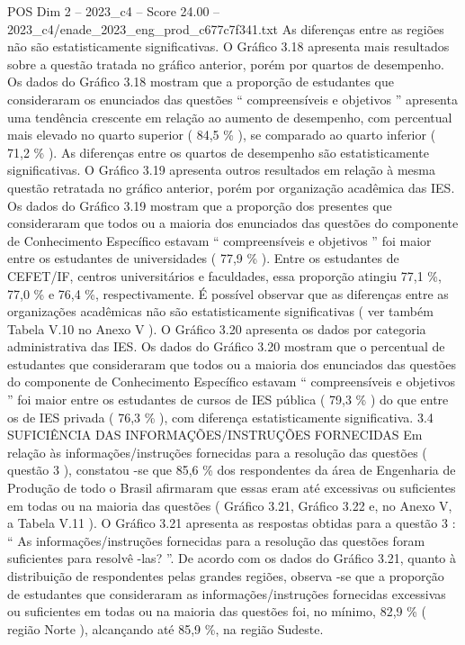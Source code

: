 \begin{textsample}{POS Dim 2 – 2023\_c4 – Score 24.00 – 2023\_c4/enade\_2023\_eng\_prod\_c677c7f341.txt}
As diferenças entre as regiões não são estatisticamente significativas.
O Gráfico 3.18 apresenta mais resultados sobre a questão tratada no gráfico anterior, porém por quartos de desempenho.
Os dados do Gráfico 3.18 mostram que a proporção de estudantes que consideraram os enunciados das questões “ compreensíveis e objetivos ” apresenta uma tendência crescente em relação ao aumento de desempenho, com percentual mais elevado no quarto superior ( 84,5 \% ), se comparado ao quarto inferior ( 71,2 \% ).
As diferenças entre os quartos de desempenho são estatisticamente significativas.
O Gráfico 3.19 apresenta outros resultados em relação à mesma questão retratada no gráfico anterior, porém por organização acadêmica das IES.
Os dados do Gráfico 3.19 mostram que a proporção dos presentes que consideraram que todos ou a maioria dos enunciados das questões do componente de Conhecimento Específico estavam “ compreensíveis e objetivos ” foi maior entre os estudantes de universidades ( 77,9 \% ).
Entre os estudantes de CEFET/IF, centros universitários e faculdades, essa proporção atingiu 77,1 \%, 77,0 \% e 76,4 \%, respectivamente.
É possível observar que as diferenças entre as organizações acadêmicas não são estatisticamente significativas ( ver também Tabela V.10 no Anexo V ).
O Gráfico 3.20 apresenta os dados por categoria administrativa das IES.
Os dados do Gráfico 3.20 mostram que o percentual de estudantes que consideraram que todos ou a maioria dos enunciados das questões do componente de Conhecimento Específico estavam “ compreensíveis e objetivos ” foi maior entre os estudantes de cursos de IES pública ( 79,3 \% ) do que entre os de IES privada ( 76,3 \% ), com diferença estatisticamente significativa. 3.4 SUFICIÊNCIA DAS INFORMAÇÕES/INSTRUÇÕES FORNECIDAS Em relação às informações/instruções fornecidas para a resolução das questões ( questão 3 ), constatou -se que 85,6 \% dos respondentes da área de Engenharia de Produção de todo o Brasil afirmaram que essas eram até excessivas ou suficientes em todas ou na maioria das questões ( Gráfico 3.21, Gráfico 3.22 e, no Anexo V, a Tabela V.11 ).
O Gráfico 3.21 apresenta as respostas obtidas para a questão 3 : “ As informações/instruções fornecidas para a resolução das questões foram suficientes para resolvê -las? ”.
De acordo com os dados do Gráfico 3.21, quanto à distribuição de respondentes pelas grandes regiões, observa -se que a proporção de estudantes que consideraram as informações/instruções fornecidas excessivas ou suficientes em todas ou na maioria das questões foi, no mínimo, 82,9 \% ( região Norte ), alcançando até 85,9 \%, na região Sudeste.

\end{textsample}
